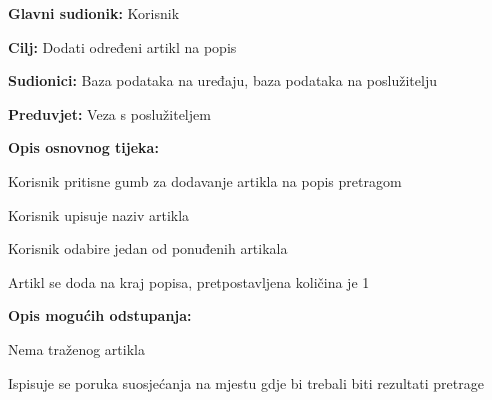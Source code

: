 					
				\noindent {}
				\begin{packed_item}
					\item \textbf{Glavni sudionik:} Korisnik
					\item  \textbf{Cilj:} Dodati određeni artikl na popis
					\item  \textbf{Sudionici:} Baza podataka na uređaju, baza podataka na poslužitelju
					\item  \textbf{Preduvjet:} Veza s poslužiteljem
					\item  \textbf{Opis osnovnog tijeka:}
					\item[] \begin{packed_enum}
						\item Korisnik pritisne gumb za dodavanje artikla na popis pretragom
						\item Korisnik upisuje naziv artikla
						\item Korisnik odabire jedan od ponuđenih artikala
						\item Artikl se doda na kraj popisa, pretpostavljena količina je 1
					\end{packed_enum}
					\item  \textbf{Opis mogućih odstupanja:}
					\item[] \begin{packed_item}
						\item[3.a] Nema traženog artikla
						\item[] \begin{packed_enum}
							\item Ispisuje se poruka suosjećanja na mjestu gdje bi trebali biti rezultati pretrage
						\end{packed_enum}
					\end{packed_item}
				\end{packed_item}
				
